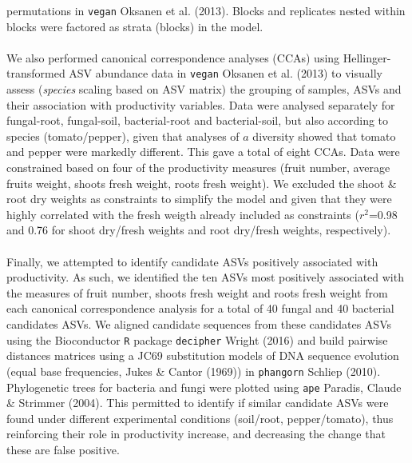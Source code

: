 \documentclass[11pt,]{article}
\begin{document}
permutations in \texttt{vegan} Oksanen et al. (2013). Blocks and
replicates nested within blocks were factored as strata (blocks) in the
model.\\
\hspace*{0.333em}\\
We also performed canonical correspondence analyses (CCAs) using
Hellinger-transformed ASV abundance data in \texttt{vegan} Oksanen et
al. (2013) to visually assess (\emph{species} scaling based on ASV
matrix) the grouping of samples, ASVs and their association with
productivity variables. Data were analysed separately for fungal-root,
fungal-soil, bacterial-root and bacterial-soil, but also according to
species (tomato/pepper), given that analyses of \(a\) diversity showed
that tomato and pepper were markedly different. This gave a total of
eight CCAs. Data were constrained based on four of the productivity
measures (fruit number, average fruits weight, shoots fresh weight,
roots fresh weight). We excluded the shoot \& root dry weights as
constraints to simplify the model and given that they were highly
correlated with the fresh weigth already included as constraints
(\(r^2\)=0.98 and 0.76 for shoot dry/fresh weights and root dry/fresh
weights, respectively). ~\\
\hspace*{0.333em}\\
Finally, we attempted to identify candidate ASVs positively associated
with productivity. As such, we identified the ten ASVs most positively
associated with the measures of fruit number, shoots fresh weight and
roots fresh weight from each canonical correspondence analysis for a
total of 40 fungal and 40 bacterial candidates ASVs. We aligned
candidate sequences from these candidates ASVs using the Bioconductor
\texttt{R} package \texttt{decipher} Wright (2016) and build pairwise
distances matrices using a JC69 substitution models of DNA sequence
evolution (equal base frequencies, Jukes \& Cantor (1969)) in
\texttt{phangorn} Schliep (2010). Phylogenetic trees for bacteria and
fungi were plotted using \texttt{ape} Paradis, Claude \& Strimmer
(2004). This permitted to identify if similar candidate ASVs were found
under different experimental conditions (soil/root, pepper/tomato), thus
reinforcing their role in productivity increase, and decreasing the
change that these are false positive.\\
\hspace*{0.333em} ~

\newpage  
\end{document}
